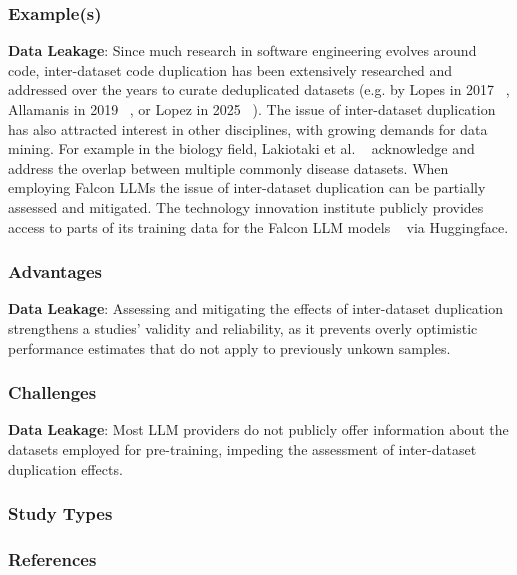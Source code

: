 \subsubsection{Example(s)}
\textbf{Data Leakage}:
Since much research in software engineering evolves around code, inter-dataset code duplication has been extensively researched and addressed over the years to curate deduplicated datasets (e.g. by Lopes in 2017 ~\cite{10.1145/3133908}, Allamanis in 2019 ~\cite{10.1145/3359591.3359735}, or Lopez in 2025 ~\cite{inter-dataset-lopez2025}).
The issue of inter-dataset duplication has also attracted interest in other disciplines, with growing demands for data mining. For example in the biology field, Lakiotaki et al. ~\cite{10.1093/database/bay011} acknowledge and address the overlap between multiple commonly disease datasets. 
When employing Falcon LLMs the issue of inter-dataset duplication can be partially assessed and mitigated. The technology innovation institute publicly provides access to parts of its training data for the Falcon LLM models ~\cite{technology_innovation_institute_2023} via Huggingface.




\subsubsection{Advantages}
\textbf{Data Leakage}:
Assessing and mitigating the effects of inter-dataset duplication strengthens a studies' validity and reliability, as it prevents overly optimistic performance estimates that do not apply to previously unkown samples.



\subsubsection{Challenges}
\textbf{Data Leakage}:
Most LLM providers do not publicly offer information about the datasets employed for pre-training, impeding the assessment of inter-dataset duplication effects.



\subsubsection{Study Types}



\subsubsection{References}





